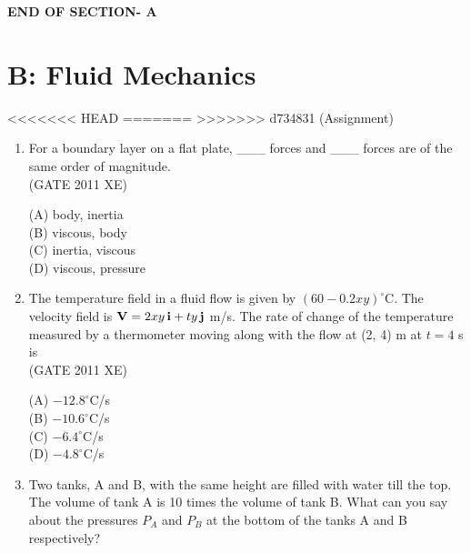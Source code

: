 \documentclass[journal,12pt,onecolumn]{IEEEtran}
\begin{document}
\begin{enumerate}
\begin{enumerate}
\begin{enumerate}[label=\textbf{Q\arabic*.},itemsep=2em]
\vspace{3\baselineskip}
    \begin{center}
    \textbf{\Large END OF SECTION- A}
    \end{center}

\end{enumerate}


\newpage
\section*{B: Fluid Mechanics}
<<<<<<< HEAD
\bigskip
=======
\vspace{1cm}
>>>>>>> d734831 (Assignment)
\begin{enumerate}

\item For a boundary layer on a flat plate, \_\_\_ forces and \_\_\_ forces are of the same order of magnitude.\\

\hfill{(GATE 2011 XE)} \\
\begin{multicols}{4}
(A) body, inertia\\
(B) viscous, body\\
(C) inertia, viscous\\
(D) viscous, pressure
\end{multicols}

\item The temperature field in a fluid flow is given by $(60 - 0.2 x y)^\circ$C. The velocity field is ${\bf V} = 2 x y\, \mathbf{i} + t y\, \mathbf{j}$ m/s. The rate of change of the temperature measured by a thermometer moving along with the flow at (2, 4) m at $t=4$ s is\\

\hfill{(GATE 2011 XE)} \\
\begin{multicols}{4}
(A) $-12.8^\circ$C/s\\
(B) $-10.6^\circ$C/s\\
(C) $-6.4^\circ$C/s\\
(D) $-4.8^\circ$C/s
\end{multicols}

\item Two tanks, A and B, with the same height are filled with water till the top. The volume of tank A is 10 times the volume of tank B. What can you say about the pressures $P_A$ and $P_B$ at the bottom of the tanks A and B respectively?\\


\end{enumerate}
\end{enumerate}
\end{enumerate}
\end{document}
